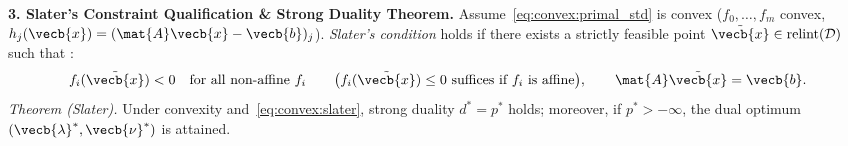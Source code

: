 \documentclass[../../../../master.tex]{subfiles}
\begin{document}
\begin{coremath}
\textbf{3. Slater's Constraint Qualification \& Strong Duality Theorem.} Assume~\eqref{eq:convex:primal_std} is convex ($f_0,\dots,f_m$ convex, $h_j(\vecb{x}) = (\mat{A}\vecb{x} - \vecb{b})_j$). \emph{Slater's condition} holds if there exists a strictly feasible point $\tilde{\vecb{x}} \in \operatorname{relint}(\mathcal{D})$ such that :
\begin{equation}
  f_i(\tilde{\vecb{x}}) < 0 \quad \text{for all non-affine } f_i \qquad \bigl(f_i(\tilde{\vecb{x}}) \le 0 \text{ suffices if } f_i \text{ is affine}\bigr), \qquad \mat{A}\tilde{\vecb{x}} = \vecb{b}.
  \label{eq:convex:slater}
\end{equation}
\emph{Theorem (Slater).} Under convexity and~\eqref{eq:convex:slater}, strong duality $d^* = p^*$ holds; moreover, if $p^* > -\infty$, the dual optimum $(\vecb{\lambda}^*, \vecb{\nu}^*)$ is attained.


\end{coremath}
\end{document}
